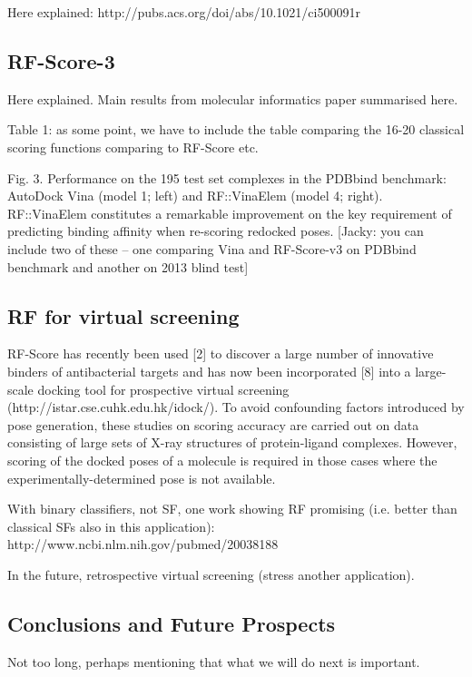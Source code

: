 \documentclass{llncs}
\begin{document}
Here explained: http://pubs.acs.org/doi/abs/10.1021/ci500091r

\subsection{RF-Score-3}

Here explained. Main results from molecular informatics paper summarised here.

Table 1: as some point, we have to include the table comparing the 16-20 classical scoring functions comparing to RF-Score etc.

Fig. 3. Performance on the 195 test set complexes in the PDBbind benchmark: AutoDock Vina (model 1; left) and RF::VinaElem (model 4; right). RF::VinaElem constitutes a remarkable improvement on the key requirement of predicting binding affinity when re-scoring redocked poses. [Jacky: you can include two of these – one comparing Vina and RF-Score-v3 on PDBbind benchmark and another on 2013 blind test]

\subsection{RF for virtual screening}

RF-Score has recently been used [2] to discover a large number of innovative binders of antibacterial targets and has now been incorporated [8] into a large-scale docking tool for prospective virtual screening (http://istar.cse.cuhk.edu.hk/idock/). To avoid confounding factors introduced by pose generation, these studies on scoring accuracy are carried out on data consisting of large sets of X-ray structures of protein-ligand complexes. However, scoring of the docked poses of a molecule is required in those cases where the experimentally-determined pose is not available.

With binary classifiers, not SF, one work showing RF promising (i.e. better than classical SFs also in this application): http://www.ncbi.nlm.nih.gov/pubmed/20038188 

In the future, retrospective virtual screening (stress another application).

\subsection{Conclusions and Future Prospects}

Not too long, perhaps mentioning that what we will do next is important.
\end{document}
